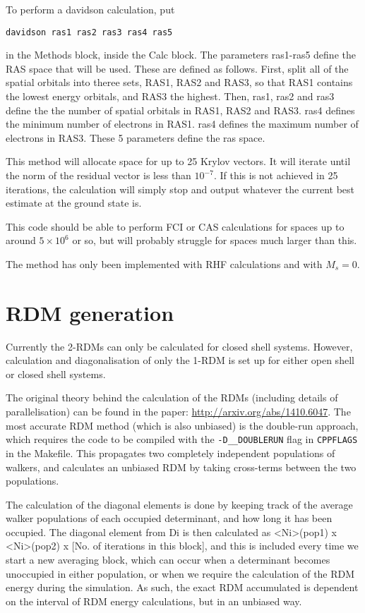 \documentclass[a4paper,notitlepage,dvipsnames]{scrreprt}
\let\code\lstinline
\begin{document}
    To perform a davidson calculation, put
    \begin{lstlisting}[gobble=4]
    	davidson ras1 ras2 ras3 ras4 ras5
    \end{lstlisting}
    in the Methods block, inside the Calc block. The parameters ras1-ras5 define
    the RAS space that will be used. These are defined as follows. First,
    split all of the spatial orbitals into theree sets, RAS1, RAS2 and RAS3,
    so that RAS1 contains the lowest energy orbitals, and RAS3 the highest.
    Then, ras1, ras2 and ras3 define the the number of spatial orbitals in
    RAS1, RAS2 and RAS3. ras4 defines the minimum number of electrons in RAS1.
    ras4 defines the maximum number of electrons in RAS3. These 5 parameters
    define the ras space.

    This method will allocate space for up to 25 Krylov vectors. It will iterate
    until the norm of the residual vector is less than $10^{-7}$. If this is
    not achieved in 25 iterations, the calculation will simply stop and output
    whatever the current best estimate at the ground state is.

    This code should be able to perform FCI or CAS calculations for spaces up
    to around $5\times10^6$ or so, but will probably struggle for spaces much
    larger than this.

    The method has only been implemented with RHF calculations and with $M_s=0$.

\section{RDM generation}
\label{sec:rdms}
Currently the 2-RDMs can only be calculated for closed shell systems.  However, calculation and
diagonalisation of only the 1-RDM is set up for either open shell or closed shell systems.

The original theory behind the calculation of the RDMs (including details of parallelisation) can be found in the paper:
\url{http://arxiv.org/abs/1410.6047}. The most accurate RDM method (which is also unbiased) is the double-run approach, which requires
the code to be compiled with the \code{-D__DOUBLERUN} flag in \code{CPPFLAGS} in the Makefile. This propagates
two completely independent populations of walkers, and calculates an unbiased RDM by taking cross-terms
between the two populations.

The calculation of the diagonal elements is done by keeping track of the average walker populations of each
occupied determinant, and how long it has been occupied.  The diagonal element from Di is then calculated
as <Ni>(pop1) x <Ni>(pop2) x [No. of iterations in this block], and this is included every time we start a new
averaging block, which can occur when a determinant becomes unoccupied in either population, or when we require
the calculation of the RDM energy during the simulation. As such, the exact RDM accumulated is dependent on
the interval of RDM energy calculations, but in an unbiased way.
\end{document}
